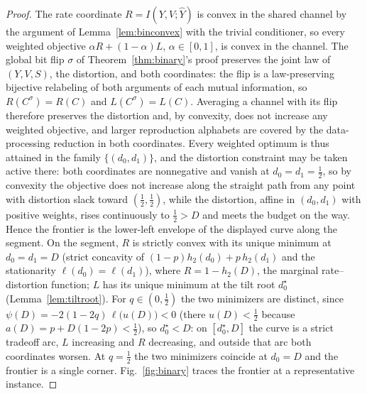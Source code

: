 \documentclass[11pt,onecolumn]{IEEEtran}
\newcommand{\hY}{\widehat{Y}}
\begin{document}
\begin{proof}
The rate
coordinate $R=I(Y,V;\hY)$ is convex in the shared channel by the
argument of Lemma~\ref{lem:binconvex} with the trivial conditioner, so
every weighted objective $\alpha R+(1-\alpha)L$, $\alpha\in[0,1]$, is
convex in the channel. The global bit flip $\sigma$ of
Theorem~\ref{thm:binary}'s proof preserves the joint law of $(Y,V,S)$,
the distortion, and both coordinates: the flip is a law-preserving
bijective relabeling of both arguments of each mutual information, so
$R(C^\sigma)=R(C)$ and $L(C^\sigma)=L(C)$. Averaging a channel with its
flip therefore preserves the distortion and, by convexity, does not
increase any weighted objective, and larger reproduction alphabets are
covered by the data-processing reduction in both coordinates. Every
weighted optimum is thus attained in the family $\{(d_0,d_1)\}$, and
the distortion constraint may be taken active there: both coordinates
are nonnegative and vanish at $d_0=d_1=\tfrac12$, so by convexity the
objective does not increase along the straight path from any point
with distortion slack toward $(\tfrac12,\tfrac12)$, while the
distortion, affine in $(d_0,d_1)$ with positive weights, rises
continuously to $\tfrac12>D$ and meets the budget on the way. Hence the
frontier is the lower-left envelope of the displayed curve along the
segment. On the segment, $R$ is strictly convex
with its unique minimum at $d_0=d_1=D$ (strict concavity of
$(1-p)h_2(d_0)+p\,h_2(d_1)$ and the stationarity
$\ell(d_0)=\ell(d_1)$), where $R=1-h_2(D)$, the marginal
rate--distortion function; $L$ has its unique minimum at the tilt root
$d_0^\star$ (Lemma~\ref{lem:tiltroot}). For $q\in(0,\tfrac12)$ the two
minimizers are distinct, since
$\psi(D)=-2(1-2q)\,\ell\bigl(u(D)\bigr)<0$ (there $u(D)<\tfrac12$
because $a(D)=p+D(1-2p)<\tfrac12$), so $d_0^\star<D$: on
$[d_0^\star,D]$ the curve is a strict tradeoff arc, $L$ increasing and
$R$ decreasing, and outside that arc both coordinates worsen. At
$q=\tfrac12$ the two minimizers coincide at $d_0=D$ and the frontier
is a single corner. Fig.~\ref{fig:binary} traces the frontier at a
representative instance.
\end{proof}
\end{document}
